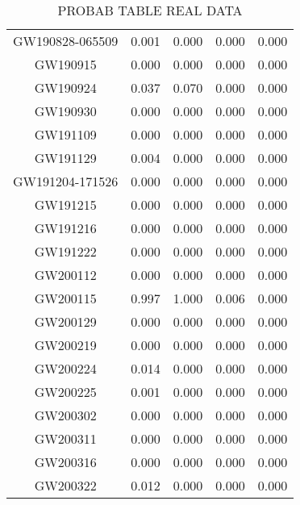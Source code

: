 \begin{table*}[]
\begin{tabular}{c|cc|cc}
GW190828-065509 &  0.001 &	0.000 &	0.000 &	0.000 \\
GW190915 &  0.000 &	0.000 &	0.000 &	0.000 \\
GW190924 &  0.037   &	0.070 & 0.000 &	0.000 \\
GW190930 &	0.000 &	 0.000 &	0.000 &	0.000 \\ 
GW191109 &	0.000 &	0.000 &	0.000 & 0.000 \\
GW191129 & 0.004 & 	0.000 &	0.000 & 0.000 \\
GW191204-171526 & 0.000 &	0.000	& 0.000 &	0.000 \\
GW191215 & 0.000 &	0.000 &	0.000 &	0.000 \\
GW191216 & 0.000 &	0.000 &	0.000 & 0.000 \\
GW191222 & 0.000 &	0.000 &	0.000 & 0.000 \\
GW200112 & 0.000 &	0.000 &	0.000 & 	0.000 \\
GW200115 &	0.997  &	1.000 &	0.006 &	0.000 \\
GW200129 & 0.000 &	0.000 &	0.000 &	0.000 \\
GW200219 & 0.000 &	0.000 &	0.000 	& 0.000 \\
GW200224 & 0.014 &	0.000 &	0.000 & 0.000 \\
GW200225 &  0.001 &	0.000 &	0.000 &	0.000 \\ 
GW200302   & 0.000 &	0.000 &	0.000 & 0.000 \\
GW200311 &	0.000 &	0.000 & 0.000 & 0.000 \\   
GW200316 & 0.000 &	0.000 &	0.000 & 0.000 \\
GW200322 & 0.012 &	0.000 &	0.000 &	0.000 \\


\hline
\end{tabular}
\caption{PROBAB TABLE REAL DATA}
\label{tab:real_data}
\end{table*}
